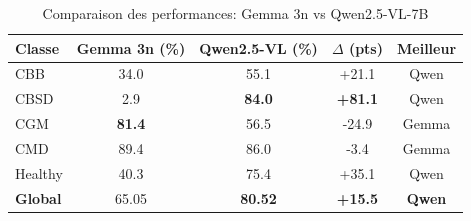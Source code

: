 
\begin{table}[h]
\centering
\caption{Comparaison des performances: Gemma 3n vs Qwen2.5-VL-7B}
\label{tab:comparaison_modeles}
\begin{tabular}{lcccc}
\hline
\textbf{Classe} & \textbf{Gemma 3n (\%)} & \textbf{Qwen2.5-VL (\%)} & \textbf{$\Delta$ (pts)} & \textbf{Meilleur} \\
\hline
CBB & 34.0 & 55.1 & +21.1 & Qwen \\
CBSD & 2.9 & \textbf{84.0} & \textbf{+81.1} & Qwen \\
CGM & \textbf{81.4} & 56.5 & -24.9 & Gemma \\
CMD & 89.4 & 86.0 & -3.4 & Gemma \\
Healthy & 40.3 & 75.4 & +35.1 & Qwen \\
\hline
\textbf{Global} & 65.05 & \textbf{80.52} & \textbf{+15.5} & \textbf{Qwen} \\
\hline
\end{tabular}
\end{table}
